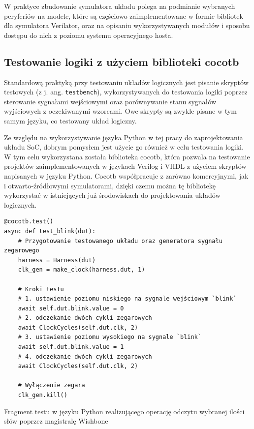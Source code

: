 W praktyce zbudowanie symulatora układu polega na podmianie wybranych peryferiów na modele, które są częściowo zaimplementowane w formie bibliotek dla symulatora Verilator, oraz na opisaniu wykorzystywanych modułów i sposobu dostępu do nich z poziomu systemu operacyjnego hosta.

\subsection{Testowanie logiki z użyciem biblioteki cocotb}

Standardową praktyką przy testowaniu układów logicznych jest pisanie skryptów testowych (z j. ang. \texttt{testbench}), wykorzystywanych do testowania logiki poprzez sterowanie sygnałami wejściowymi oraz porównywanie stanu sygnałów wyjściowych z oczekiwanymi wzorcami. Owe skrypty są zwykle pisane w tym samym języku, co testowany układ logiczny.

Ze względu na wykorzystywanie języka Python w tej pracy do zaprojektowania układu SoC, dobrym pomysłem jest użycie go również w celu testowania logiki. W tym celu wykorzystana została biblioteka cocotb\cite{cocotb:2022:Online}, która pozwala na testowanie projektów zaimplementowanych w językach Verilog i VHDL z użyciem skryptów napisanych w języku Python. Cocotb współpracuje z zarówno komercyjnymi, jak i otwarto-źródłowymi symulatorami, dzięki czemu można tę bibliotekę wykorzystać w istniejących już środowiskach do projektowania układów logicznych.

\begin{longlisting}
\begin{verbatim}
@cocotb.test()
async def test_blink(dut):
    # Przygotowanie testowanego układu oraz generatora sygnału zegarowego
    harness = Harness(dut)
    clk_gen = make_clock(harness.dut, 1)

    # Kroki testu
    # 1. ustawienie poziomu niskiego na sygnale wejściowym `blink`
    await self.dut.blink.value = 0
    # 2. odczekanie dwóch cykli zegarowych
    await ClockCycles(self.dut.clk, 2)
    # 3. ustawienie poziomu wysokiego na sygnale `blink`
    await self.dut.blink.value = 1
    # 4. odczekanie dwóch cykli zegarowych
    await ClockCycles(self.dut.clk, 2)

    # Wyłączenie zegara
    clk_gen.kill()
\end{verbatim}
\caption{\label{lst:tooling-sampletest}Fragment testu w języku Python realizującego operację odczytu wybranej ilości słów poprzez magistralę Wishbone}
\end{longlisting}

